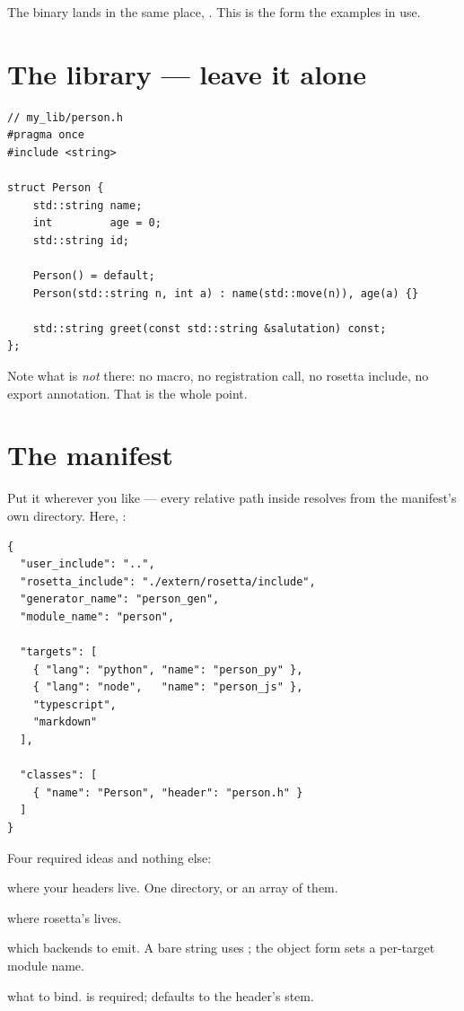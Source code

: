 The binary lands in the same place, . This is the
form the examples in  use.

\section{The library --- leave it alone}

\begin{lstlisting}[style=cpp]
// my_lib/person.h
#pragma once
#include <string>

struct Person {
    std::string name;
    int         age = 0;
    std::string id;

    Person() = default;
    Person(std::string n, int a) : name(std::move(n)), age(a) {}

    std::string greet(const std::string &salutation) const;
};
\end{lstlisting}

Note what is \emph{not} there: no macro, no registration call, no rosetta
include, no export annotation. That is the whole point.

\section{The manifest}

Put it wherever you like --- every relative path inside resolves from the
manifest's own directory. Here, :

\begin{lstlisting}[style=json]
{
  "user_include": "..",
  "rosetta_include": "./extern/rosetta/include",
  "generator_name": "person_gen",
  "module_name": "person",

  "targets": [
    { "lang": "python", "name": "person_py" },
    { "lang": "node",   "name": "person_js" },
    "typescript",
    "markdown"
  ],

  "classes": [
    { "name": "Person", "header": "person.h" }
  ]
}
\end{lstlisting}

Four required ideas and nothing else:

\begin{description}[leftmargin=0cm,style=nextline,font=\normalfont\code]
  \item[user\_include] where your headers live. One directory, or an array of
    them.
  \item[rosetta\_include] where rosetta's  lives.
  \item[targets] which backends to emit. A bare string uses
    ; the object form sets a per-target module name.
  \item[classes] what to bind.  is required; 
    defaults to the header's stem.
\end{description}

